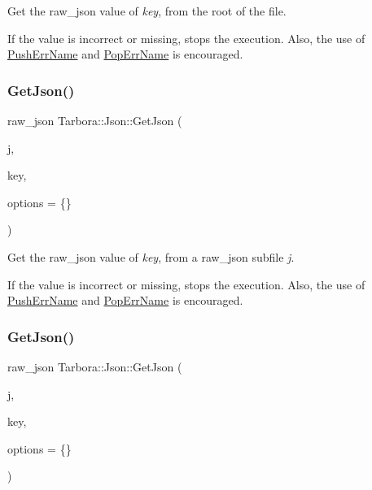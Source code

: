Get the raw\+\_\+json value of {\itshape key}, from the root of the file. 

If the value is incorrect or missing, stops the execution. Also, the use of \hyperlink{classTarbora_1_1Json_a061eac4f16dac3b9b3a26a66de0ea8f0}{Push\+Err\+Name} and \hyperlink{classTarbora_1_1Json_a14019f06d3bd76edd6a6e78134519d11}{Pop\+Err\+Name} is encouraged. \mbox{\label{classTarbora_1_1Json_a46aeffce57fb2925471f82c7c4638b12}} 
\subsubsection{\texorpdfstring{Get\+Json()}{GetJson()}\hspace{0.1cm}{\footnotesize\ttfamily [2/3]}}
{\footnotesize\ttfamily raw\+\_\+json Tarbora\+::\+Json\+::\+Get\+Json (\begin{DoxyParamCaption}\item[{raw\+\_\+json}]{j,  }\item[{const char $\ast$}]{key,  }\item[{\hyperlink{structTarbora_1_1JsonOptions}{Json\+Options}}]{options = {\ttfamily \{\}} }\end{DoxyParamCaption})}



Get the raw\+\_\+json value of {\itshape key}, from a raw\+\_\+json subfile {\itshape j}. 

If the value is incorrect or missing, stops the execution. Also, the use of \hyperlink{classTarbora_1_1Json_a061eac4f16dac3b9b3a26a66de0ea8f0}{Push\+Err\+Name} and \hyperlink{classTarbora_1_1Json_a14019f06d3bd76edd6a6e78134519d11}{Pop\+Err\+Name} is encouraged. \mbox{\label{classTarbora_1_1Json_a6f7c9943589e6b5c831f1515bb65d339}} 
\subsubsection{\texorpdfstring{Get\+Json()}{GetJson()}\hspace{0.1cm}{\footnotesize\ttfamily [3/3]}}
{\footnotesize\ttfamily raw\+\_\+json Tarbora\+::\+Json\+::\+Get\+Json (\begin{DoxyParamCaption}\item[{raw\+\_\+json}]{j,  }\item[{int}]{key,  }\item[{\hyperlink{structTarbora_1_1JsonOptions}{Json\+Options}}]{options = {\ttfamily \{\}} }\end{DoxyParamCaption})}

